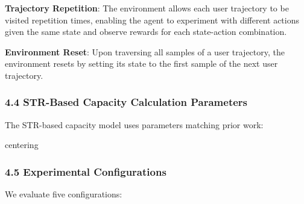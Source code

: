 \textbf{Trajectory Repetition}: The environment allows each user
trajectory to be visited repetition times, enabling the agent to
experiment with different actions given the same state and observe
rewards for each state-action combination.

\textbf{Environment Reset}: Upon traversing all samples of a user
trajectory, the environment resets by setting its state to the first
sample of the next user trajectory.

\hypertarget{str-based-capacity-calculation-parameters}{%
	\subsubsection{4.4 STR-Based Capacity Calculation
		Parameters}\label{str-based-capacity-calculation-parameters}}

The STR-based capacity model uses parameters matching prior work:

\begin{table}[t]
	centering
	\caption{STR-Based Capacity Calculation Parameters}
	\label{str-params-table}
\end{table}

\hypertarget{experimental-configurations}{%
	\subsubsection{4.5 Experimental
		Configurations}\label{experimental-configurations}}

We evaluate five configurations:

